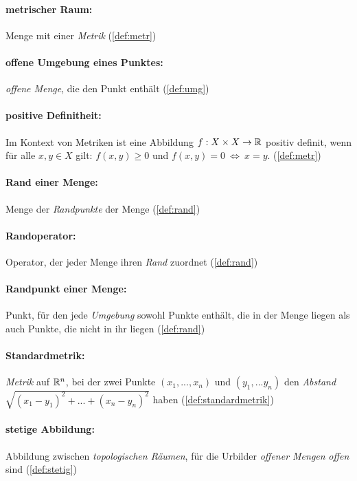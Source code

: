     \paragraph{metrischer Raum:} Menge mit einer \textit{Metrik} (\ref{def:metr})

    \paragraph{offene Umgebung eines Punktes:} \textit{offene Menge}, die den Punkt enthält (\ref{def:umg})
    
    \paragraph{positive Definitheit:} Im Kontext von Metriken ist eine Abbildung $f:X \times X \to \mathbb{R}$ positiv definit, wenn für alle $x,y \in X$ gilt: $f(x,y) \geq 0$ und $f(x,y) = 0 \ \Leftrightarrow \ x = y$. (\ref{def:metr})

    \paragraph{Rand einer Menge:} Menge der \textit{Randpunkte} der Menge (\ref{def:rand})

    \paragraph{Randoperator:} Operator, der jeder Menge ihren \textit{Rand} zuordnet (\ref{def:rand})

    \paragraph{Randpunkt einer Menge:} Punkt, für den jede \textit{Umgebung} sowohl Punkte enthält, die in der Menge liegen als auch Punkte, die nicht in ihr liegen (\ref{def:rand})
    
    \paragraph{Standardmetrik:} \textit{Metrik} auf $\mathbb{R}^n$, bei der zwei Punkte $(x_1, ... , x_n)$ und $(y_1, ... y_n)$ den \textit{Abstand} $\sqrt{(x_1-y_1)^2 + ... + (x_n - y_n)^2}$ haben (\ref{def:standardmetrik})

    \paragraph{stetige Abbildung:} Abbildung zwischen \textit{topologischen Räumen}, für die Urbilder \textit{offener Mengen} \textit{offen} sind (\ref{def:stetig})
    
